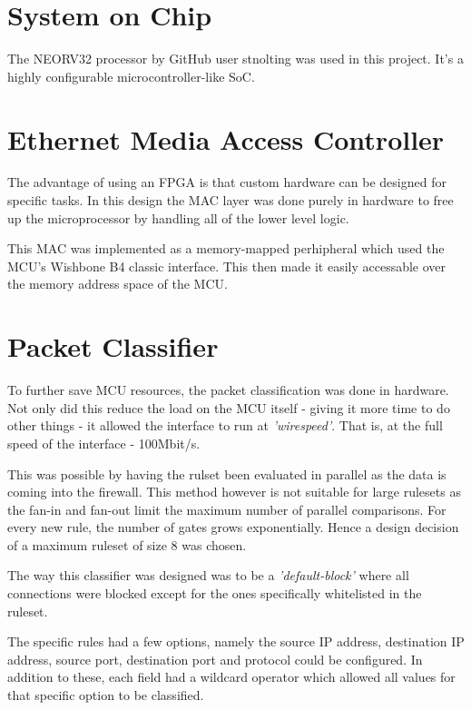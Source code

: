 \section{System on Chip}

The NEORV32 processor by GitHub user stnolting was used in this project. It's a highly configurable microcontroller-like SoC. 







\section{Ethernet Media Access Controller}
The advantage of using an FPGA is that custom hardware can be designed for specific tasks. In this design the MAC layer was done purely in hardware to free up the microprocessor by handling all of the lower level logic. 

This MAC was implemented as a memory-mapped perhipheral which used the MCU's Wishbone B4 classic interface. This then made it easily accessable over the memory address space of the MCU.  



\section{Packet Classifier}

To further save MCU resources, the packet classification was done in hardware. Not only did this reduce the load on the MCU itself - giving it more time to do other things - it allowed the interface to run at \textit{'wirespeed'}. That is, at the full speed of the interface - 100Mbit/s. 

This was possible by having the rulset been evaluated in parallel as the data is coming into the firewall. This method however is not suitable for large rulesets as the fan-in and fan-out limit the maximum number of parallel comparisons. For every new rule, the number of gates grows exponentially. Hence a design decision of a maximum ruleset of size 8 was chosen. 

The way this classifier was designed was to be a \textit{'default-block'} where all connections were blocked except for the ones specifically whitelisted in the ruleset. 

The specific rules had a few options, namely the source IP address, destination IP address, source port, destination port and protocol could be configured. In addition to these, each field had a wildcard operator which allowed all values for that specific option to be classified. 

